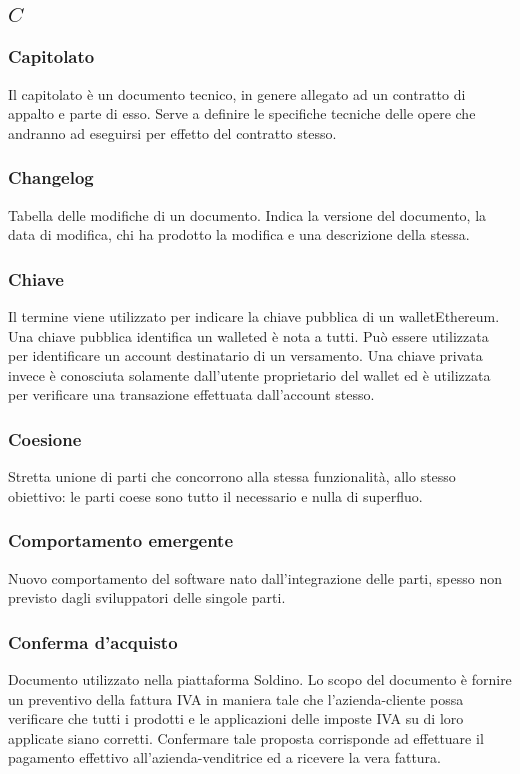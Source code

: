 \subsection*{\quad$C\quad$}
\subsubsection*{Capitolato}
Il capitolato è un documento tecnico, in genere allegato ad un contratto di appalto e parte di esso. Serve a definire le specifiche tecniche delle opere che andranno ad eseguirsi per effetto del contratto stesso.

\subsubsection*{Changelog}
Tabella delle modifiche di un documento. Indica la versione del documento, la data di modifica, chi ha prodotto
la modifica e una descrizione della stessa.

\subsubsection*{Chiave}
Il termine viene utilizzato per indicare la chiave pubblica di un wallet\glosp Ethereum\glosp. Una chiave pubblica identifica un wallet\glosp ed è nota a tutti. Può essere utilizzata per identificare un account destinatario di un versamento. Una chiave privata invece è conosciuta solamente dall'utente proprietario del wallet ed è utilizzata per verificare una transazione effettuata dall'account stesso. 

\subsubsection*{Coesione}
Stretta unione di parti che concorrono alla stessa funzionalità, allo stesso obiettivo: le parti coese sono tutto il necessario e nulla di superfluo.

\subsubsection*{Comportamento emergente}
Nuovo comportamento del software nato dall'integrazione delle parti, spesso non previsto dagli sviluppatori delle singole parti.

\subsubsection*{Conferma d'acquisto}
Documento utilizzato nella piattaforma Soldino. Lo scopo del documento è fornire un preventivo della fattura IVA in maniera tale che l'azienda-cliente possa verificare che tutti i prodotti e le applicazioni delle imposte IVA su di loro applicate siano corretti. Confermare tale proposta corrisponde ad effettuare il pagamento effettivo all'azienda-venditrice ed a ricevere la vera fattura.


